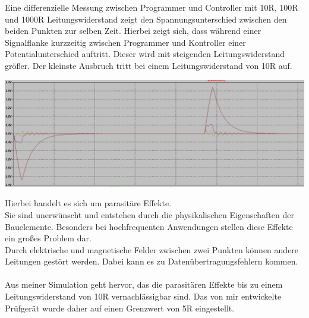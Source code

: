 \newpage

Eine differenzielle Messung zwischen Programmer und Controller mit 10R, 100R und 1000R Leitungswiderstand  zeigt den Spannungsunterschied zwischen den beiden Punkten zur selben Zeit. Hierbei zeigt sich, dass während einer Signalflanke kurzzeitig zwischen Programmer und Kontroller einer Potentialunterschied auftritt. Dieser wird mit steigenden Leitungswiderstand größer. Der kleinste Ausbruch tritt bei einem Leitungswiderstand von 10R auf.


\begin{center}
\includegraphics[width=17cm]{Bilder/LTC-SIGNALVERLAUF2.png}
\end{center}

Hierbei handelt es sich um parasitäre Effekte. 
\\
Sie sind unerwünscht und entstehen durch die physikalischen Eigenschaften der Bauelemente. Besonders bei hochfrequenten Anwendungen stellen diese Effekte ein großes Problem dar.
\\
Durch elektrische und magnetische Felder zwischen zwei Punkten können andere Leitungen gestört werden. Dabei kann es zu Datenübertragungsfehlern kommen.
\\
\\
Aus meiner Simulation geht hervor, das die parasitären Effekte bis zu einem Leitungswiderstand von 10R vernachlässigbar sind. Das von mir entwickelte Prüfgerät wurde daher auf einen Grenzwert von 5R eingestellt. 
